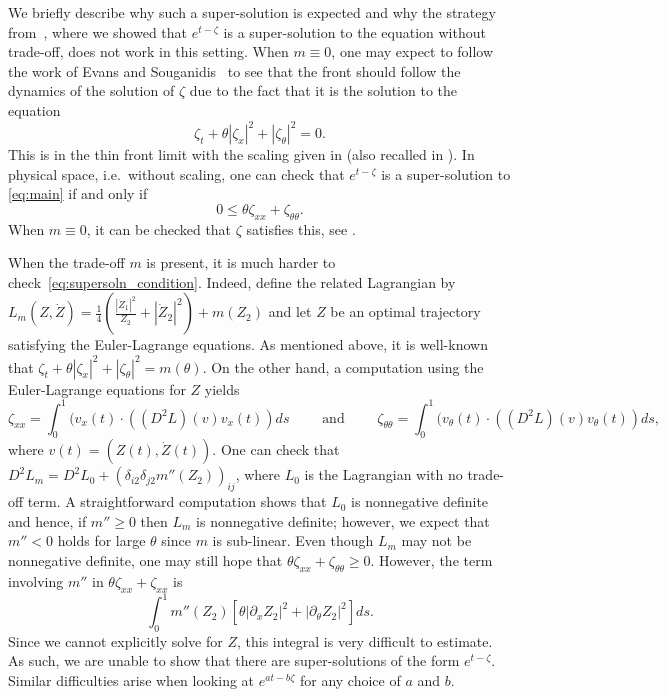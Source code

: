 \documentclass[11pt]{article}    %
\begin{document}
We briefly describe why such a super-solution is expected and why the strategy from~\cite{BHR_Acceleration}, where we showed that $e^{t-\zeta}$ is a super-solution to the equation without trade-off, does not work in this setting.  When $m \equiv 0$, one may expect to follow the work of Evans and Souganidis~\cite{EvansSouganidis} to see that the front should follow the dynamics of the solution of $\zeta$ due to the fact that it is the solution to the equation 
\[
	\zeta_t + \theta|\zeta_x|^2 + |\zeta_\theta|^2 = 0.
\]
This is in the thin front limit with the scaling given in \cite{BCMetal} (also recalled in \cite{BHR_Acceleration}). In physical space, i.e.~without scaling, one can check that $e^{t-\zeta}$ is a super-solution to \eqref{eq:main} if and only if
\begin{equation}\label{eq:supersoln_condition}
0 \leq \theta \zeta_{xx} + \zeta_{\theta\theta}.
\end{equation}
When $m \equiv 0$, it can be checked that $\zeta$ satisfies this, see \cite{BHR_Acceleration}.

When the trade-off $m$ is present, it is much harder to check~\eqref{eq:supersoln_condition}.  Indeed, define the related Lagrangian by $L_m(Z,\dot Z) = \frac{1}{4} \left(\frac{|\dot Z_1|^2}{Z_2} + |\dot Z_2 |^2\right)  + m(Z_2)$ and let $Z$ be an optimal trajectory satisfying the Euler-Lagrange equations.  As mentioned above, it is well-known that $\zeta_t + \theta |\zeta_x|^2 + |\zeta_\theta|^2 = m(\theta)$.  On the other hand, a computation using the Euler-Lagrange equations for $Z$ yields
\[
	\zeta_{xx} = \int_0^1 (v_x(t) \cdot ((D^2 L)(v) v_x(t)) ds
		\qquad\text{ and }\qquad
	\zeta_{\theta\theta} = \int_0^1 (v_\theta(t) \cdot ((D^2L)(v)v_\theta(t)) ds,
\]
where $v(t) = (Z(t), \dot Z(t))$.  One can check that $D^2L_m = D^2L_0 + (\delta_{i2} \delta_{j2} m''(Z_2))_{ij}$, where $L_0$ is the Lagrangian with no trade-off term.  A straightforward computation shows that $L_0$ is nonnegative definite and hence, if $m'' \geq 0$ then $L_m$ is nonnegative definite; however, we expect that $m'' < 0$ holds for large $\theta$ since $m$ is sub-linear.  Even though $L_m$ may not be nonnegative definite, one may still hope that $\theta\zeta_{xx} + \zeta_{\theta\theta} \geq 0$.  However, the term involving $m''$ in $\theta \zeta_{xx} + \zeta_{xx}$ is
\[
	\int_0^1 m''(Z_2) \left[\theta |\partial_x Z_2|^2 + |\partial_\theta Z_2|^2 \right] ds.
\]
Since we cannot explicitly solve for $Z$, this integral is very difficult to estimate.  As such, we are unable to show that there are super-solutions of the form $e^{t - \zeta}$.  Similar difficulties arise when looking at $e^{at - b \zeta}$ for any choice of $a$ and $b$.
\end{document}
